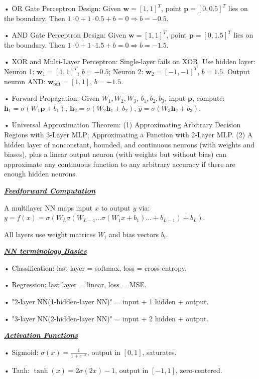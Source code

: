 \documentclass[10pt]{article}
\newcommand{\bulletPoint}[1]{\ul{\textit{\textbf{#1}}}}
\begin{document}
\begin{multicols*}{3}
• OR Gate Perceptron Design:
Given $\mathbf{w} = [1, 1]^T$, point $\mathbf{p} = [0, 0.5]^T$ lies on the boundary. \quad
Then $1 \cdot 0 + 1 \cdot 0.5 + b = 0 \Rightarrow b = -0.5$. 

• AND Gate Perceptron Design:
Given $\mathbf{w} = [1, 1]^T$, point $\mathbf{p} = [0, 1.5]^T$ lies on the boundary. \quad
Then $1 \cdot 0 + 1 \cdot 1.5 + b = 0 \Rightarrow b = -1.5$. 

• XOR and Multi-Layer Perceptron:
Single-layer fails on XOR. Use hidden layer: \quad
Neuron 1: $\mathbf{w}_1 = [1,1]^T$, $b = -0.5$; Neuron 2: $\mathbf{w}_2 = [-1,-1]^T$, $b = 1.5$. \quad
Output neuron AND: $\mathbf{w}_{\text{out}} = [1,1]$, $b = -1.5$. 

• Forward Propagation: 
Given $W_1, W_2, W_3$, $b_1, b_2, b_3$, input $\mathbf{p}$, compute: \quad
$\mathbf{h}_1 = \sigma(W_1 \mathbf{p} + b_1)$, $\mathbf{h}_2 = \sigma(W_2 \mathbf{h}_1 + b_2)$, $\hat{y} = \sigma(W_3 \mathbf{h}_2 + b_3)$.

• Universal Approximation Theorem:
(1) Approximating Arbitrary Decision Regions with 3-Layer MLP; Approximating a Function with 2-Layer MLP.
(2) A hidden layer of nonconstant, bounded, and continuous neurons (with weights
and biases), plus a linear output neuron (with weights but without bias) can
approximate any continuous function to any arbitrary accuracy if there are
enough hidden neurons. 

\bulletPoint{Feedforward Computation} \quad

A multilayer NN maps input $x$ to output $y$ via: 
$y = f(x) = \sigma(W_L \sigma(W_{L-1} \dots \sigma(W_1 x + b_1) \dots + b_{L-1}) + b_L)$. \quad

All layers use weight matrices $W_i$ and bias vectors $b_i$. 

\bulletPoint{NN terminology Basics} \quad

• Classification: last layer = softmax, loss = cross-entropy. \quad

• Regression: last layer = linear, loss = MSE. \quad

• "2-layer NN(1-hidden-layer NN)" = input + 1 hidden + output. \quad

• "3-layer NN(2-hidden-layer NN)" = input + 2 hidden + output.

\bulletPoint{Activation Functions} \quad

• Sigmoid: $\sigma(x) = \frac{1}{1 + e^{-x}}$, output in $[0,1]$, saturates. \quad

• Tanh: $\tanh(x)=2\sigma(2x)-1$, output in $[-1,1]$, zero-centered. \quad


\end{multicols*}
\end{document}
